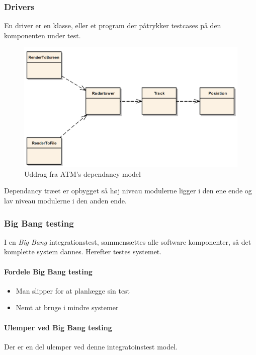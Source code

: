 \subsubsection{Drivers}
En driver er en klasse, eller et program der påtrykker testcases på den komponenten under test.

\begin{figure}[H]
\centering
\includegraphics[width=0.78\linewidth]{figs/dependancyATM.PNG}
\caption{Uddrag fra ATM's dependancy model}
\label{fig:dependancyATM}
\end{figure}

Dependancy træet er opbygget så høj niveau modulerne ligger i den ene ende og lav niveau modulerne i den anden ende.


\subsubsection{Big Bang testing}
I en \textit{Big Bang} integrationstest, sammensættes alle software komponenter, så det komplette system dannes. Herefter testes systemet.

\paragraph{Fordele Big Bang testing}
\begin{itemize}
	\item Man slipper for at planlægge sin test
	\item Nemt at bruge i mindre systemer
\end{itemize}

\paragraph{Ulemper ved Big Bang testing}
Der er en del ulemper ved denne integratoinstest model.

